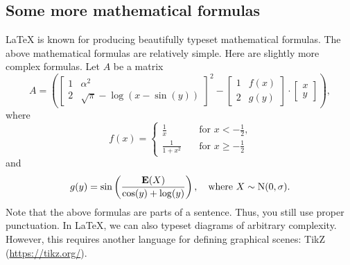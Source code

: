 \documentclass[english, twoside, 12pt, a4paper]{article}
\theoremstyle{definition}
\theoremstyle{plain}
\theoremstyle{remark}
\begin{document}
\subsection{Some more mathematical formulas}

\LaTeX{} is known for producing beautifully typeset mathematical formulas. The above mathematical formulas are relatively simple. Here are slightly more complex formulas. Let \(A\) be a matrix
\[
A =
\left(
\begin{bmatrix}
1                   & \alpha^2       \\
2                   & \sqrt{\pi} - \log(x-\sin(y))
\end{bmatrix}^{2}
- 
\begin{bmatrix}
1                   & f(x)           \\
2                   & g(y)
\end{bmatrix}
\cdot
\begin{bmatrix}
x                                    \\
y
\end{bmatrix}
\right),
\]
where
\[
f(x) = 
\left\{
  \begin{aligned}
    \frac{1}{x}     & \quad \text{for \(x<-\frac{1}{2}\),} \\
    \frac{1}{1+x^2} & \quad \text{for \(x \geq -\frac{1}{2}\)}
  \end{aligned}
\right.
\]
and
\[
g(y) = \sin\left(\frac{\mathrm{\mathbf{E}}(X)}{\cos(y) + \log(y)}\right), 
\quad\text{where \( X \sim \mathrm{N}(0, \sigma)  \).}
\]
Note that the above formulas are parts of a sentence. Thus, you still use proper punctuation. In \LaTeX{}, we can also typeset diagrams of arbitrary complexity. However, this requires another language for defining graphical scenes: TikZ (\url{https://tikz.org/}). 
\end{document}
